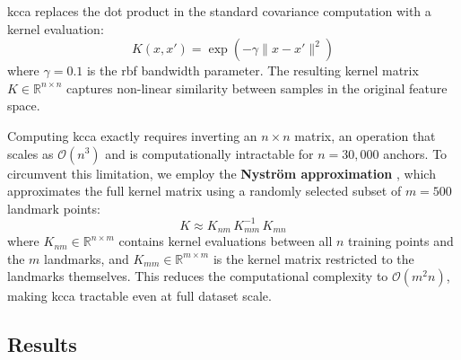 \gls{kcca} replaces the dot product in the standard covariance computation with a kernel evaluation:
\begin{equation}
    K(x, x') = \exp\!\left(-\gamma \|x - x'\|^2\right)
    \label{eq:rbf_kernel}
\end{equation}
where $\gamma = 0.1$ is the \gls{rbf} bandwidth parameter. The resulting kernel matrix $K \in \mathbb{R}^{n \times n}$ captures non-linear similarity between samples in the original feature space.

Computing \gls{kcca} exactly requires inverting an $n \times n$ matrix, an operation that scales as $\mathcal{O}(n^3)$ and is computationally intractable for $n = 30{,}000$ anchors. To circumvent this limitation, we employ the \textbf{Nyström approximation} \cite{williams2001nystrom}, which approximates the full kernel matrix using a randomly selected subset of $m = 500$ landmark points:
\begin{equation}
    K \approx K_{nm}\, K_{mm}^{-1}\, K_{mn}
    \label{eq:nystrom}
\end{equation}
where $K_{nm} \in \mathbb{R}^{n \times m}$ contains kernel evaluations between all $n$ training points and the $m$ landmarks, and $K_{mm} \in \mathbb{R}^{m \times m}$ is the kernel matrix restricted to the landmarks themselves. This reduces the computational complexity to $\mathcal{O}(m^2 n)$, making \gls{kcca} tractable even at full dataset scale.

\subsection{Results}
\label{subsec:kcca_results}

